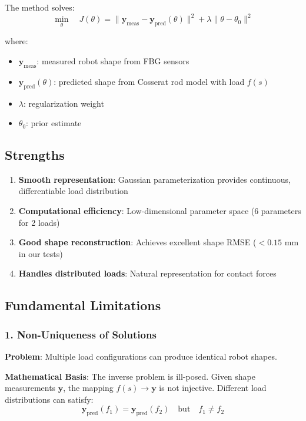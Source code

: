 \documentclass[11pt]{article}
\begin{document}
The method solves:
\begin{equation}
\min_{\theta} \quad J(\theta) = \|\mathbf{y}_{\text{meas}} - \mathbf{y}_{\text{pred}}(\theta)\|^2 + \lambda \|\theta - \theta_0\|^2
\end{equation}

where:
\begin{itemize}
    \item $\mathbf{y}_{\text{meas}}$: measured robot shape from FBG sensors
    \item $\mathbf{y}_{\text{pred}}(\theta)$: predicted shape from Cosserat rod model with load $f(s)$
    \item $\lambda$: regularization weight
    \item $\theta_0$: prior estimate
\end{itemize}

\subsection{Strengths}

\begin{enumerate}
    \item \textbf{Smooth representation}: Gaussian parameterization provides continuous, differentiable load distribution
    \item \textbf{Computational efficiency}: Low-dimensional parameter space (6 parameters for 2 loads)
    \item \textbf{Good shape reconstruction}: Achieves excellent shape RMSE ($<0.15$ mm in our tests)
    \item \textbf{Handles distributed loads}: Natural representation for contact forces
\end{enumerate}

\subsection{Fundamental Limitations}

\subsubsection{1. Non-Uniqueness of Solutions}

\textbf{Problem}: Multiple load configurations can produce identical robot shapes.

\textbf{Mathematical Basis}: The inverse problem is ill-posed. Given shape measurements $\mathbf{y}$, the mapping $f(s) \rightarrow \mathbf{y}$ is not injective. Different load distributions can satisfy:
\begin{equation}
\mathbf{y}_{\text{pred}}(f_1) = \mathbf{y}_{\text{pred}}(f_2) \quad \text{but} \quad f_1 \neq f_2
\end{equation}
\end{document}
